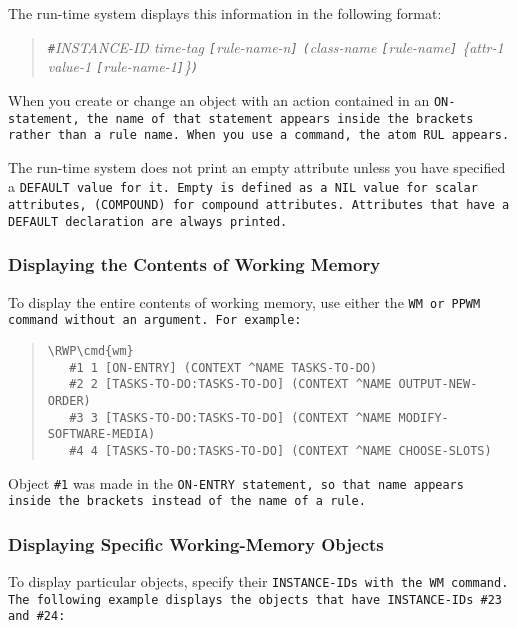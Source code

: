 The run-time system displays this information in the following format:

\begin{quote}
  \verb|#|\it{INSTANCE-ID} \it{time-tag} \verb|[|\it{rule-name-n}\verb|]| \verb|(|\it{class-name} \verb|[|\it{rule-name}\verb|]|
  \{\it{attr-1} \it{value-1} \verb|[|\it{rule-name-1}\verb|]|\}\verb|)|
\end{quote}

When you create or change an object with an action contained in an
\tt{ON-} statement, the name of that statement appears inside the
brackets rather than a rule name. When you use a command, the atom
\tt{RUL} appears.

The run-time system does not print an empty attribute unless you have
specified a \tt{DEFAULT} value for it. Empty is defined as a \tt{NIL}
value for scalar attributes, \tt{(COMPOUND)} for compound attributes.
Attributes that have a \tt{DEFAULT} declaration are always printed.

\subsubsection{Displaying the Contents of Working Memory}

To display the entire contents of working memory, use either the
\tt{WM} or \tt{PPWM} command without an argument. For example:

\begin{quote}
\begin{Verbatim}[commandchars=\\\{\}]
\RWP\cmd{wm}
   #1 1 [ON-ENTRY] (CONTEXT ^NAME TASKS-TO-DO)
   #2 2 [TASKS-TO-DO:TASKS-TO-DO] (CONTEXT ^NAME OUTPUT-NEW-ORDER)
   #3 3 [TASKS-TO-DO:TASKS-TO-DO] (CONTEXT ^NAME MODIFY-SOFTWARE-MEDIA)
   #4 4 [TASKS-TO-DO:TASKS-TO-DO] (CONTEXT ^NAME CHOOSE-SLOTS)
\end{Verbatim}
\end{quote}

Object \verb|#1| was made in the \tt{ON-ENTRY} statement, so that name
appears inside the brackets instead of the name of a rule.

\subsubsection{Displaying Specific Working-Memory Objects}

To display particular objects, specify their \tt{INSTANCE-ID}s with
the \tt{WM} command. The following example displays the objects that
have \tt{INSTANCE-ID}s \verb|#23| and \verb|#24|:

